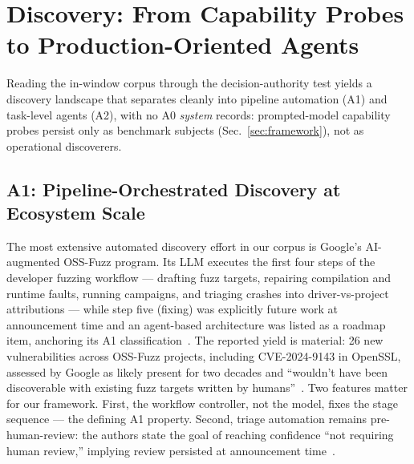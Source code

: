\section{Discovery: From Capability Probes to Production-Oriented Agents}
\label{sec:discovery}

Reading the in-window corpus through the decision-authority test yields a discovery landscape
that separates cleanly into pipeline automation (A1) and task-level agents (A2), with no A0
\emph{system} records: prompted-model capability probes persist only as benchmark subjects
(Sec.~\ref{sec:framework}), not as operational discoverers.

\subsection{A1: Pipeline-Orchestrated Discovery at Ecosystem Scale}
The most extensive automated discovery effort in our corpus is Google's AI-augmented
OSS-Fuzz program. Its LLM executes the first four steps of the developer fuzzing workflow ---
drafting fuzz targets, repairing compilation and runtime faults, running campaigns, and
triaging crashes into driver-vs-project attributions --- while step five (fixing) was
explicitly future work at announcement time and an agent-based architecture was listed as a
roadmap item, anchoring its A1 classification~\cite{ossfuzzlvlup2024}. The reported yield is
material: 26 new vulnerabilities across OSS-Fuzz projects, including CVE-2024-9143 in OpenSSL,
assessed by Google as likely present for two decades and ``wouldn't have been discoverable with
existing fuzz targets written by humans''~\cite{ossfuzzlvlup2024}. Two features matter for our
framework. First, the workflow controller, not the model, fixes the stage sequence --- the
defining A1 property. Second, triage automation remains pre-human-review: the authors state the
goal of reaching confidence ``not requiring human review,'' implying review persisted at
announcement time~\cite{ossfuzzlvlup2024}.

